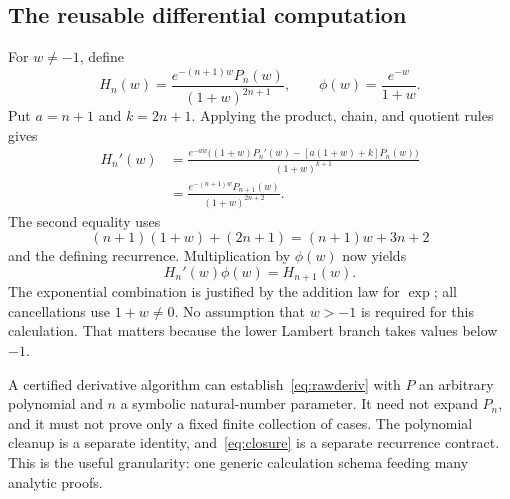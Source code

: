 \documentclass[11pt,a4paper]{article}
\theoremstyle{remark}
\begin{document}
\subsection{The reusable differential computation}
For $w\ne-1$, define
\[
 H_n(w)=\frac{e^{-(n+1)w}P_n(w)}{(1+w)^{2n+1}},
 \qquad \phi(w)=\frac{e^{-w}}{1+w}.
\]
Put $a=n+1$ and $k=2n+1$. Applying the product, chain, and quotient rules gives
\begin{align}
 H_n'(w)
 &=\frac{e^{-aw}\bigl((1+w)P_n'(w)
               -[a(1+w)+k]P_n(w)\bigr)}{(1+w)^{k+1}}
 \label{eq:rawderiv}\\
 &=\frac{e^{-(n+1)w}P_{n+1}(w)}{(1+w)^{2n+2}}.
 \label{eq:deriv}
\end{align}
The second equality uses
\[
 (n+1)(1+w)+(2n+1)=(n+1)w+3n+2
\]
and the defining recurrence. Multiplication by $\phi(w)$ now yields
\begin{equation}
 H_n'(w)\phi(w)=H_{n+1}(w).
 \label{eq:closure}
\end{equation}
The exponential combination is justified by the addition law for $\exp$; all
cancellations use $1+w\ne0$. No assumption that $w>-1$ is required for this
calculation. That matters because the lower Lambert branch takes values below
$-1$.

A certified derivative algorithm can establish~\eqref{eq:rawderiv} with $P$ an
arbitrary polynomial and $n$ a symbolic natural-number parameter. It need not
expand $P_n$, and it must not prove only a fixed finite collection of cases.
The polynomial cleanup is a separate identity, and~\eqref{eq:closure} is a
separate recurrence contract. This is the useful granularity: one generic
calculation schema feeding many analytic proofs.

\end{document}
